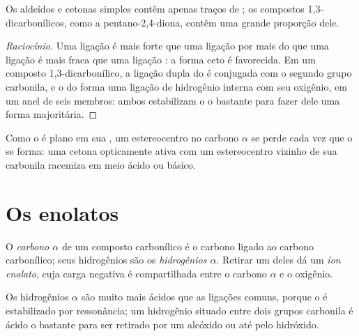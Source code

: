 \begin{proposition}\label{prop:b2:enolates-aldol:enol-content}
Os aldeídos e cetonas simples contêm apenas traços de ; os compostos 1,3-dicarbonílicos, como a
pentano-2,4-diona, contêm uma grande proporção dele.
\end{proposition}

\begin{proof}[Raciocínio]
Uma ligação  é mais forte que uma ligação  por mais do que uma ligação  é mais
fraca que uma ligação : a forma ceto é favorecida. Em um composto 1,3-dicarbonílico, a ligação
dupla do  é conjugada com o segundo grupo carbonila, e o  do  forma uma ligação de
hidrogênio interna com seu oxigênio, em um anel de seis membros: ambos estabilizam o  o bastante
para fazer dele uma forma majoritária.
\end{proof}

Como o  é plano em sua , um estereocentro no carbono $\alpha$ se perde cada vez que o
 se forma: uma cetona opticamente ativa com um estereocentro vizinho de sua carbonila racemiza em
meio ácido ou básico.

\section{Os enolatos}

\begin{definition}[Enolatos]\label{def:b2:enolates-aldol:enolate}
O \emph{carbono $\alpha$} de um composto carbonílico é o carbono
ligado ao carbono carbonílico; seus hidrogênios são os \emph{hidrogênios $\alpha$}.
Retirar um deles dá um \emph{íon enolato}, cuja
carga negativa é compartilhada entre o carbono $\alpha$ e o oxigênio.
\end{definition}

\begin{proposition}\label{prop:b2:enolates-aldol:alpha-acidity}
Os hidrogênios $\alpha$ são muito mais ácidos que as ligações  comuns, porque o  é
estabilizado por ressonância; um hidrogênio situado entre dois grupos carbonila é ácido o bastante
para ser retirado por um alcóxido ou até pelo hidróxido.
\end{proposition}

